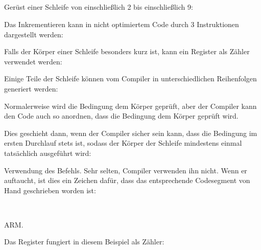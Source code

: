 \subsection{\Zusammenfassung{}}

Gerüst einer Schleife von einschließlich 2 bis einschließlich 9:



Das Inkrementieren kann in nicht optimiertem Code durch 3 Instruktionen
dargestellt werden:



Falls der Körper einer Schleife besonders kurz ist, kann ein Register als Zähler
verwendet werden:



Einige Teile der Schleife können vom Compiler in unterschiedlichen Reihenfolgen
generiert werden:



Normalerweise wird die Bedingung  dem Körper geprüft, aber der Compiler
kann den Code auch so anordnen, dass die Bedingung  dem Körper geprüft
wird.

Dies geschieht dann, wenn der Compiler sicher sein kann, dass die Bedingung im
ersten Durchlauf stets  ist, sodass der Körper der Schleife mindestens
einmal tatsächlich ausgeführt wird:




Verwendung des  Befehls. Sehr selten, Compiler verwenden ihn nicht.
Wenn er auftaucht, ist dies ein Zeichen dafür, dass das entsprechende
Codesegment von Hand geschrieben worden ist:

　


ARM. 

Das  Register fungiert in diesem Beispiel als Zähler:

　


